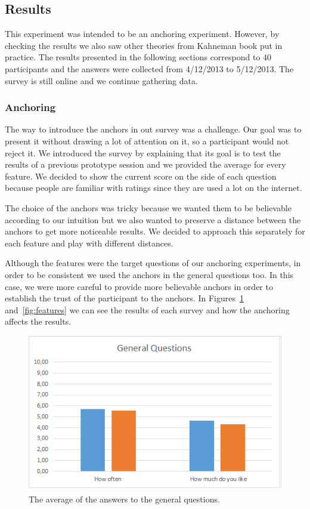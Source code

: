 \documentclass[Main.tex]{subfiles}
\begin{document}
\subsection{Results}
This experiment was intended to be an anchoring experiment. However, by checking the results we also saw other theories from Kahneman book  put in practice. The results presented in the following sections correspond to 40 participants and the answers were collected from 4/12/2013 to 5/12/2013. The survey is still online and we continue gathering data.

\subsubsection{Anchoring}
The way to introduce the anchors in out survey was a challenge. Our goal was to present it without drawing a lot of attention on it, so a participant would not reject it. We introduced the survey by explaining that its goal is to test the results of a previous prototype session and we provided the average for every feature. We decided to show the current score on the side of each question because people are familiar with ratings since they are used a lot on the internet.

The choice of the anchors was tricky because we wanted them to be believable according to our intuition but we also wanted to preserve a distance between the anchors to  get more noticeable results. We decided to approach this separately for each feature and play with different distances.

Although the features were the target questions of our anchoring experiments, in order to be consistent we used the anchors in the general questions too. In this case, we were more careful to provide more believable anchors in order to establish the trust of the participant to the anchors. In Figures~\ref{fig:general} and~\ref{fig:features} we can see the results of each survey and how the anchoring affects the results.

\begin{figure}
\includegraphics[width=\textwidth]{GeneralQuestions.png}
\caption{The average of the answers to the general questions.}
\label{fig:general}
\end{figure}
\end{document}

